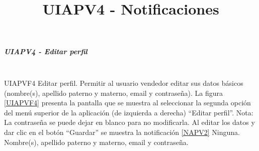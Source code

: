 \subparagraph{UIAPV4 - Editar perfil} ~\\

{UIAPVF4} %
{Editar perfil.}  %
{Permitir al usuario vendedor editar sus datos básicos (nombre(s), apellido paterno y materno, email y contraseña). } %
{La figura \ref{UIAPVF4} presenta la pantalla que se muestra al seleccionar la segunda opción del menú superior de la aplicación (de izquierda a derecha) ``Editar perfil''. Nota: La contraseña se puede dejar en blanco para no modificarla. Al editar los datos y dar clic en el botón ``Guardar'' se muestra la notificación \ref{NAPV2} } %
{Ninguna.} %
{Nombre(s), apellido paterno y materno, email y contraseña.} %



\title{\textbf{UIAPV4 - Notificaciones}\\}

